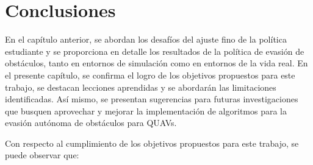 \chapter{Conclusiones}
\label{capitulo7}

En el capítulo anterior, se abordan los desafíos del ajuste fino de la política estudiante y se proporciona en detalle los resultados de la política de evasión de obstáculos, tanto en entornos de simulación como en entornos de la vida real. En el presente capítulo, se confirma el logro de los objetivos propuestos para este trabajo, se destacan lecciones aprendidas y se abordarán las limitaciones identificadas. Así mismo, se presentan sugerencias para futuras investigaciones que busquen aprovechar y mejorar la implementación de algoritmos para la evasión autónoma de obstáculos para QUAVs.

Con respecto al cumplimiento de los objetivos propuestos para este trabajo, se puede observar que: 

